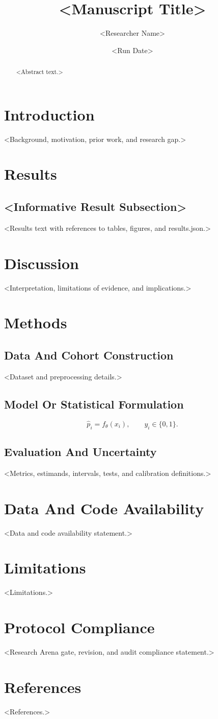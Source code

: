 \documentclass[11pt]{article}
\title{<Manuscript Title>}
\author{<Researcher Name>}
\date{<Run Date>}
\numberwithin{equation}{section}
\begin{document}
\maketitle

\begin{abstract}
<Abstract text.>
\end{abstract}

\section{Introduction}
<Background, motivation, prior work, and research gap.>

\section{Results}
\subsection{<Informative Result Subsection>}
<Results text with references to tables, figures, and results.json.>

\section{Discussion}
<Interpretation, limitations of evidence, and implications.>

\section{Methods}
\subsection{Data And Cohort Construction}
<Dataset and preprocessing details.>

\subsection{Model Or Statistical Formulation}
\begin{equation}
\hat{p}_i = f_{\theta}(x_i), \qquad y_i \in \{0,1\}.
\label{eq:prediction-model}
\end{equation}

\subsection{Evaluation And Uncertainty}
<Metrics, estimands, intervals, tests, and calibration definitions.>

\section{Data And Code Availability}
<Data and code availability statement.>

\section{Limitations}
<Limitations.>

\section{Protocol Compliance}
<Research Arena gate, revision, and audit compliance statement.>

\section{References}
<References.>
\end{document}
